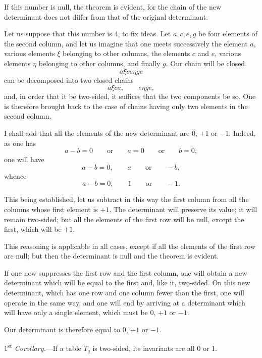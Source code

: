 \documentclass{article}
\begin{document}
If this number is null, the theorem is evident, for the chain of the new determinant does not differ from that of the original determinant.

Let us suppose that this number is 4, to fix ideas. Let $a, c, e, g$ be four elements of the second column, and let us imagine that one meets successively the element $a$, various elements $\xi$ belonging to other columns, the elements $c$ and $e$, various elements $\eta$ belonging to other columns, and finally $g$. Our chain will be closed.
\[ a\xi ce\eta ge \]
can be decomposed into two closed chains
\[ a\xi ca, \qquad e\eta ge, \]
and, in order that it be two-sided, it suffices that the two components be so. One is therefore brought back to the case of chains having only two elements in the second column.

I shall add that all the elements of the new determinant are 0, $+1$ or $-1$. Indeed, as one has
\[ a-b = 0 \qquad \text{or} \qquad a = 0 \qquad \text{or} \qquad b = 0, \]
one will have
\[ a-b = 0, \qquad a \qquad \text{or} \qquad -b, \]
whence
\[ a-b = 0, \qquad 1 \qquad \text{or} \qquad -1. \]

This being established, let us subtract in this way the first column from all the columns whose first element is $+1$. The determinant will preserve its value; it will remain two-sided; but all the elements of the first row will be null, except the first, which will be $+1$.

This reasoning is applicable in all cases, except if all the elements of the first row are null; but then the determinant is null and the theorem is evident.

If one now suppresses the first row and the first column, one will obtain a new determinant which will be equal to the first and, like it, two-sided. On this new determinant, which has one row and one column fewer than the first, one will operate in the same way, and one will end by arriving at a determinant which will have only a single element, which must be 0, $+1$ or $-1$.

Our determinant is therefore equal to 0, $+1$ or $-1$.

1\textsuperscript{st} \emph{Corollary.}---If a table $T_{q}$ is two-sided, its invariants are all 0 or 1.
\end{document}

